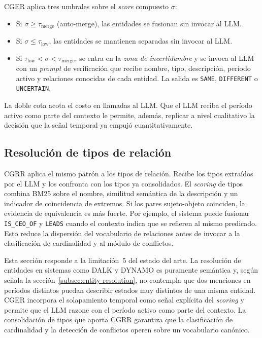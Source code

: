 CGER aplica tres umbrales sobre el \emph{score} compuesto $\sigma$:
\begin{itemize}
    \item Si $\sigma \ge \tau_{\text{merge}}$ (auto-merge), las entidades se fusionan sin invocar al LLM.
    \item Si $\sigma \le \tau_{\text{low}}$, las entidades se mantienen separadas sin invocar al LLM.
    \item Si $\tau_{\text{low}} < \sigma < \tau_{\text{merge}}$, se entra en la \emph{zona de incertidumbre} y se invoca al LLM con un \emph{prompt} de verificación que recibe nombre, tipo, descripción, período activo y relaciones conocidas de cada entidad. La salida es \texttt{SAME}, \texttt{DIFFERENT} o \texttt{UNCERTAIN}.
\end{itemize}

La doble cota acota el costo en llamadas al LLM. Que el LLM reciba el período activo como parte del contexto le permite, además, replicar a nivel cualitativo la decisión que la señal temporal ya empujó cuantitativamente.

\subsection{Resolución de tipos de relación}

CGRR aplica el mismo patrón a los tipos de relación. Recibe los tipos extraídos por el LLM y los confronta con los tipos ya consolidados. El \emph{scoring} de tipos combina BM25 sobre el nombre, similitud semántica de la descripción y un indicador de coincidencia de extremos. Si los pares sujeto-objeto coinciden, la evidencia de equivalencia es más fuerte. Por ejemplo, el sistema puede fusionar \texttt{IS\_CEO\_OF} y \texttt{LEADS} cuando el contexto indica que se refieren al mismo predicado. Esto reduce la dispersión del vocabulario de relaciones antes de invocar a la clasificación de cardinalidad y al módulo de conflictos.

Esta sección responde a la limitación~5 del estado del arte. La resolución de entidades en sistemas como DALK y DYNAMO es puramente semántica y, según señala la sección~\ref{subsec:entity-resolution}, no contempla que dos menciones en períodos distintos puedan describir estados muy distintos de una misma entidad. CGER incorpora el solapamiento temporal como señal explícita del \emph{scoring} y permite que el LLM razone con el período activo como parte del contexto. La consolidación de tipos que aporta CGRR garantiza que la clasificación de cardinalidad y la detección de conflictos operen sobre un vocabulario canónico.

